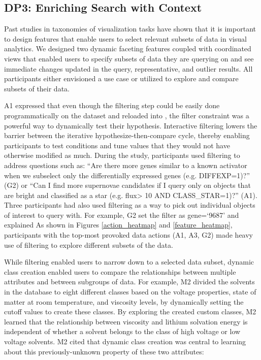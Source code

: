 \subsection{DP3: Enriching Search with Context}
\par Past studies in taxonomies of visualization tasks have shown that it is important to design features that enable users to select relevant subsets of data in visual analytics\cite{Amar2005,Heer2012}. We designed two dynamic faceting features coupled with coordinated views that enabled users to specify subsets of data they are querying on and see immediate changes updated in the query, representative, and outlier results. All participants either envisioned a use case or utilized  to explore and compare subsets of their data.
\par A1 expressed that even though the filtering step could be easily done programmatically on the dataset and reloaded into \zv, the filter constraint was a powerful way to dynamically test their hypothesis. Interactive filtering lowers the barrier between the iterative hypothesize-then-compare cycle, thereby enabling participants to test conditions and tune values that they would not have otherwise modified as much.
During the study, participants used filtering to address questions such as: ``Are there more genes similar to a known activator when we subselect only the differentially expressed genes (e.g. DIFFEXP=1)?'' (G2) or ``Can I find more supernovae candidates if I query only on objects that are bright and classified as a star (e.g. flux\textgreater
10 AND CLASS\_STAR=1)?'' (A1). Three participants had also used filtering as a way to pick out individual objects of interest to query with. For example, G2 set the filter as gene=`9687' and explained 
As shown in Figures \ref{action_heatmap} and \ref{feature_heatmap}, participants with the top-most provoked data actions (A1, A3, G2) made heavy use of filtering to explore different subsets of the data.
\par While filtering enabled users to narrow down to a selected data subset, dynamic class creation enabled users to compare the relationships between multiple attributes and between subgroups of data. For example, M2 divided the solvents in the database to eight different classes based on the voltage properties, state of matter at room temperature, and viscosity levels, by dynamically setting the cutoff values to create these classes. By exploring the created custom classes, M2 learned that the relationship between viscosity and lithium solvation energy is independent of whether a solvent belongs to the class of high voltage or low voltage solvents. M2 cited that dynamic class creation was central to learning about this previously-unknown property of these two attributes:
